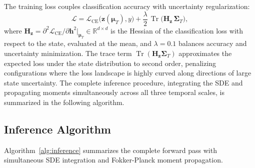 \documentclass[journal]{IEEEtran}
\newcommand{\R}{\mathbb{R}}
\DeclareMathOperator{\Tr}{Tr}
\begin{document}
The training loss couples classification accuracy with uncertainty regularization:
\begin{equation}
\mathcal{L} = \mathcal{L}_{\mathrm{CE}}\!\big(\mathbf{z}(\boldsymbol{\mu}_T), y\big) + \frac{\lambda}{2}\, \Tr\!\big(\mathbf{H}_{\mathbf{z}}\, \boldsymbol{\Sigma}_T\big),
\label{eq:loss}
\end{equation}
where $\mathbf{H}_{\mathbf{z}} = \partial^2 \mathcal{L}_{\mathrm{CE}} / \partial \mathbf{h}^2 \big|_{\boldsymbol{\mu}_T} \in \R^{d \times d}$ is the Hessian of the classification loss with respect to the state, evaluated at the mean, and $\lambda = 0.1$ balances accuracy and uncertainty minimization. The trace term $\Tr(\mathbf{H}_{\mathbf{z}} \boldsymbol{\Sigma}_T)$ approximates the expected loss under the state distribution to second order, penalizing configurations where the loss landscape is highly curved along directions of large state uncertainty. The complete inference procedure, integrating the SDE and propagating moments simultaneously across all three temporal scales, is summarized in the following algorithm.


\subsection{Inference Algorithm}

Algorithm~\ref{alg:inference} summarizes the complete forward pass with simultaneous SDE integration and Fokker-Planck moment propagation.
\end{document}
